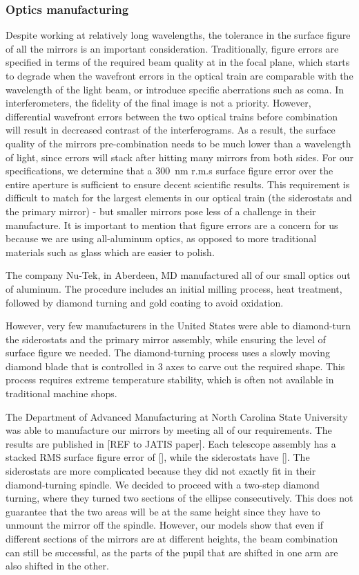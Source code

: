 \subsubsection{Optics manufacturing}

Despite working at relatively long wavelengths, the tolerance in the surface figure of all the mirrors is an important consideration. Traditionally, figure errors are specified in terms of the required beam quality at in the focal plane, which starts to degrade when the wavefront errors in the optical train are comparable with the wavelength of the light beam, or introduce specific aberrations such as coma. In interferometers, the fidelity of the final image is not a priority. However, differential wavefront errors between the two optical trains before combination will result in decreased contrast of the interferograms. As a result, the surface quality of the mirrors pre-combination needs to be much lower than a wavelength of light, since errors will stack after hitting many mirrors from both sides. For our specifications, we determine that a \SI{300}{\nano\meter} r.m.s surface figure error over the entire aperture is sufficient to ensure decent scientific results. This requirement is difficult to match for the largest elements in our optical train (the siderostats and the primary mirror) - but smaller mirrors pose less of a challenge in their manufacture. It is important to mention that figure errors are a concern for us because we are using all-aluminum optics, as opposed to more traditional materials such as glass which are easier to polish.

The company Nu-Tek, in Aberdeen, MD manufactured all of our small optics out of aluminum. The procedure includes an initial milling process, heat treatment, followed by diamond turning and gold coating to avoid oxidation.

However, very few manufacturers in the United States were able to diamond-turn the siderostats and the primary mirror assembly, while ensuring the level of surface figure we needed. The diamond-turning process uses a slowly moving diamond blade that is controlled in 3 axes to carve out the required shape. This process requires extreme temperature stability, which is often not available in traditional machine shops. 

The Department of Advanced Manufacturing at North Carolina State University was able to manufacture our mirrors by meeting all of our requirements. The results are published in [REF to JATIS paper]. Each telescope assembly has a stacked RMS surface figure error of [], while the siderostats have []. The siderostats are more complicated because they did not exactly fit in their diamond-turning spindle. We decided to proceed with a two-step diamond turning, where they turned two sections of the ellipse consecutively. This does not guarantee that the two areas will be at the same height since they have to unmount the mirror off the spindle. However, our models show that even if different sections of the mirrors are at different heights, the beam combination can still be successful, as the parts of the pupil that are shifted in one arm are also shifted in the other. 




